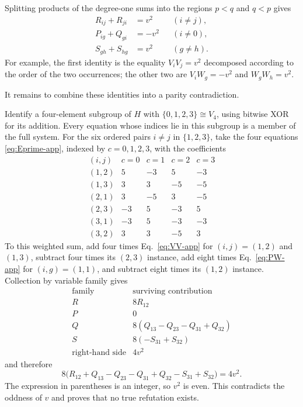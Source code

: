\documentclass[11pt]{article}
\theoremstyle{definition}
\theoremstyle{remark}
\numberwithin{equation}{section}
\begin{document}
Splitting products of the degree-one sums into the regions \(p<q\) and
\(q<p\) gives
\begin{align}
  R_{ij}+R_{ji}&=v^2 &&(i\ne j),\label{eq:VV-app}\\
  P_{ig}+Q_{gi}&=-v^2 &&(i\ne0),\label{eq:PW-app}\\
  S_{gh}+S_{hg}&=v^2 &&(g\ne h).\label{eq:WW-app}
\end{align}
For example, the first identity is the equality
\(V_iV_j=v^2\) decomposed according to the order of the two occurrences;
the other two are \(V_iW_g=-v^2\) and \(W_gW_h=v^2\).

It remains to combine these identities into a parity contradiction.

Identify a four-element subgroup of \(H\) with
\(\{0,1,2,3\}\cong V_4\), using bitwise XOR for its addition.  Every equation
whose indices lie in this subgroup is a member of the full system.
For the six ordered pairs \(i\ne j\) in \(\{1,2,3\}\), take the four
equations \eqref{eq:Eprime-app}, indexed by \(c=0,1,2,3\), with the
coefficients
\[
\begin{array}{c|rrrr}
(i,j)&c=0&c=1&c=2&c=3\\ \hline
(1,2)& 5&-3& 5&-3\\
(1,3)& 3& 3&-5&-5\\
(2,1)& 3&-5& 3&-5\\
(2,3)&-3& 5&-3& 5\\
(3,1)&-3& 5&-3&-3\\
(3,2)& 3& 3&-5& 3
\end{array}
\]
To this weighted sum, add four times Eq.~\eqref{eq:VV-app} for
\((i,j)=(1,2)\) and \((1,3)\), subtract four times its \((2,3)\) instance,
add eight times Eq.~\eqref{eq:PW-app} for \((i,g)=(1,1)\), and subtract eight
times its \((1,2)\) instance.  Collection by variable family gives
\[
\begin{array}{c|l}
\text{family}&\text{surviving contribution}\\
\hline
R&8R_{12}\\
P&0\\
Q&8(Q_{13}-Q_{23}-Q_{31}+Q_{32})\\
S&8(-S_{31}+S_{32})\\
\text{right-hand side}&4v^2
\end{array}
\]
and therefore
\[
  8\bigl(
  R_{12}+Q_{13}-Q_{23}-Q_{31}+Q_{32}-S_{31}+S_{32}
  \bigr)=4v^2.
\]
The expression in parentheses is an integer, so \(v^2\) is even.  This
contradicts the oddness of \(v\) and proves that no true refutation exists.
\end{document}
